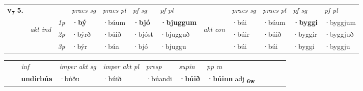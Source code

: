 \begin{tabular}{llllllllllll} \toprule
\multirow{4}{*}{{{\textbf{v{\textsubscript{7}}} \Large{\textbf{5.}}}}}  & &   &  \textit{praes sg}  & \textit{praes pl}  &\textit{ pf sg} & \textit{pf pl} &  &  \textit{praes sg}  & \textit{praes pl}  & \textit{pf sg} & \textit{pf pl } \\*
	\cmidrule{4-7} \cmidrule{9-12}
 & \multirow{3}{*}{\begin{turn}{90}\textit{akt ind}\end{turn}} & {\textit{1p}} & \textbf{·bý} & ·búum    & \textbf{·bjó} & \textbf{·bjuggum} & \multirow{3}{*}{\begin{turn}{90}\textit{akt con}\end{turn}} &·búi & ·búum & \textbf{·byggi} & ·byggjum\\*
& &  {\textit{2p}} &  ·býrð  & ·búið   & ·bjóst & ·bjugguð & & ·búir & ·búið & ·byggir & ·byggjuð \\*
& &  {\textit{3p}} & ·býr & ·búa   & ·bjó & ·bjuggu & & ·búi & ·búi& ·byggi & ·byggju  \\*
\cmidrule{4-7} \cmidrule{9-12}
\end{tabular}


\begin{tabular}{llllllllllll}
 & & \textit{inf} & \textit{imper akt sg} & \textit{imper akt pl}   & \textit{presp} & \textit{supin}  & \textit{pp m}     \\*
  & & \textbf{undirbúa} & ·búðu  & ·búið   & ·búandi &  \textbf{·búið}  & \textbf{·búinn} adj \textbf{\textsubscript{6w}} \\*
\cmidrule{1-12}
\end{tabular}



